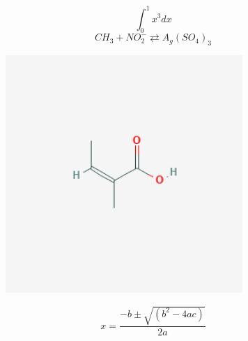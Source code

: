 \documentclass[a4paper, 12pt, titlepage, legno]{article}
\begin{document}
\tableofcontents

\newpage\begin{equation}
\int_{0}^{1} x^{3} d x
\end{equation}
\begin{equation}
C H_{3}+N O_{2}^{-} \rightleftarrows A_{g}\left(S O_{4}\right)_{3}
\end{equation}
\begin{figure}[ht!]
\centering
\includegraphics[width=90mm]{../out/mol1.png}
\end{figure}\begin{equation}
x=\frac{-b \pm \sqrt{\left(b^{2}-4 a c\right)}}{2 a}
\end{equation}
\end{document}
